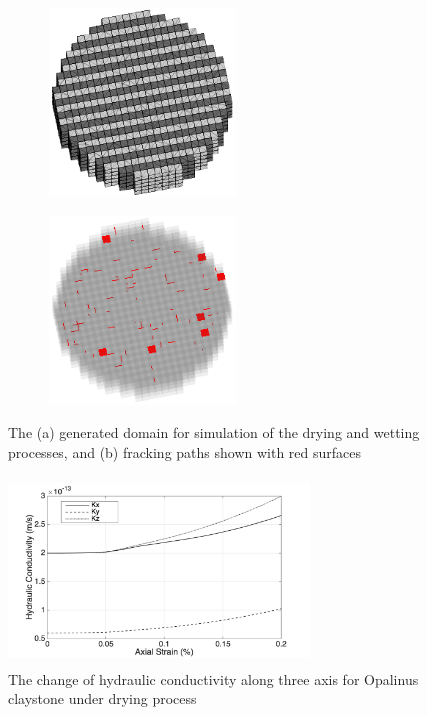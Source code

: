 \begin{figure}[!ht]
\begin{subfigure}[c]{0.5\textwidth}
\centering
\includegraphics[width=5cm,height=5cm]{figures/Amir_ME6_Lattice_Setup.png}
\subcaption{}
\label{fig:Amir_ME6_Lattice_Setup}
\end{subfigure}
\begin{subfigure}[c]{0.5\textwidth}
\centering
\includegraphics[width=5cm,height=5cm]{figures/Amir_ME6_Lattice_Frack.png}
\subcaption{}
\label{fig:Amir_ME6_Lattice_Frack}
\end{subfigure}
\caption{The (a) generated domain for simulation of the drying and wetting processes, and (b) fracking paths shown with red surfaces}
\end{figure}

\begin{figure}[!ht]
\centering
\includegraphics[width=8cm,height=5cm]{figures/Amir_ME6_Lattice_Drying.png}
\caption{The change of hydraulic conductivity along three axis for Opalinus claystone under drying process}
\label{fig:Amir_ME6_Lattice_Drying}
\end{figure} 

